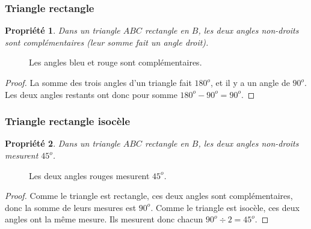\documentclass[12 pt]{article}
\theoremstyle{plain}
\newcounter{n}
\numberwithin{n}{section}
\newtheorem*{prop}{Propriété}
\begin{document}
\subsubsection{Triangle rectangle}

\begin{prop}
Dans un triangle $ABC$ rectangle en $B$, les deux angles non-droits sont complémentaires (leur somme fait un angle droit). 
\end{prop}\begin{figure}[H]\center
{}
\caption{Les angles bleu et rouge sont complémentaires.}
\end{figure}


\begin{proof}
La somme des trois angles d'un triangle fait $180^o$, et il y a un angle de $90^o$. Les deux angles restants 
ont donc pour somme $180^o - 90^o= 90^o$.
\end{proof}

\subsubsection{Triangle rectangle isocèle}
\begin{prop}
Dans un triangle $ABC$ rectangle en $B$, les deux angles non-droits mesurent $45^o$. 
\end{prop}\begin{figure}[H]\center
{}
\caption{Les deux angles rouges mesurent $45^o$.}
\end{figure}
\begin{proof} 
Comme le triangle est rectangle, ces deux angles sont complémentaires, donc la somme de leurs mesures est $90^o$. 
Comme le triangle est isocèle, ces deux angles ont la 
même mesure. Ils mesurent donc chacun $90^o\div 2 = 45^o$. 
\end{proof}
\end{document}
